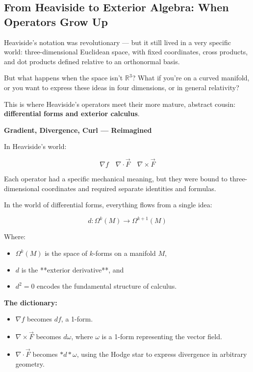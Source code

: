\subsection{From Heaviside to Exterior Algebra: When Operators Grow Up}

Heaviside’s notation was revolutionary — but it still lived in a very specific world: three-dimensional Euclidean space, with fixed coordinates, cross products, and dot products defined relative to an orthonormal basis.

But what happens when the space isn’t \( \mathbb{R}^3 \)?  
What if you’re on a curved manifold, or you want to express these ideas in four dimensions, or in general relativity?

This is where Heaviside’s operators meet their more mature, abstract cousin:  
\textbf{differential forms and exterior calculus}.

\bigskip

\textbf{Gradient, Divergence, Curl — Reimagined}

In Heaviside’s world:

\[
\nabla f \quad \nabla \cdot \vec{F} \quad \nabla \times \vec{F}
\]

Each operator had a specific mechanical meaning, but they were bound to three-dimensional coordinates and required separate identities and formulas.

In the world of differential forms, everything flows from a single idea:

\[
d: \Omega^k(M) \to \Omega^{k+1}(M)
\]

Where:
\begin{itemize}
    \item \( \Omega^k(M) \) is the space of \( k \)-forms on a manifold \( M \),
    \item \( d \) is the **exterior derivative**, and
    \item \( d^2 = 0 \) encodes the fundamental structure of calculus.
\end{itemize}

\bigskip

\textbf{The dictionary:}
\begin{itemize}
    \item \( \nabla f \) becomes \( df \), a 1-form.
    \item \( \nabla \times \vec{F} \) becomes \( d\omega \), where \( \omega \) is a 1-form representing the vector field.
    \item \( \nabla \cdot \vec{F} \) becomes \( \ast d \ast \omega \), using the Hodge star to express divergence in arbitrary geometry.
\end{itemize}

